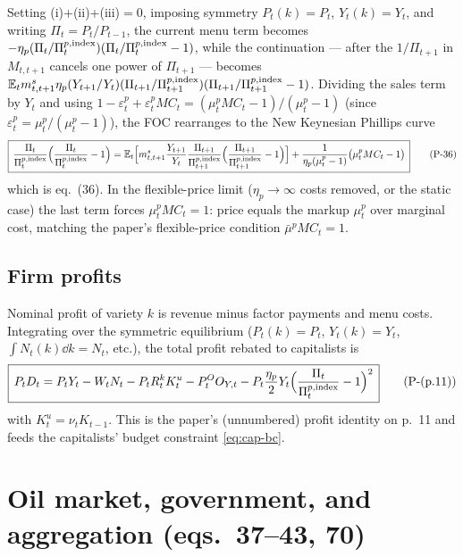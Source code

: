 Setting (i)+(ii)+(iii)$=0$, imposing symmetry $P_t(k)=P_t$, $Y_t(k)=Y_t$, and writing
$\Pi_t=P_t/P_{t-1}$, the current menu term becomes
$-\eta_p(\Pi_t/\Pi^{p,\text{index}}_t)(\Pi_t/\Pi^{p,\text{index}}_t-1)$, while the continuation --- after the
$1/\Pi_{t+1}$ in $M_{t,t+1}$ cancels one power of $\Pi_{t+1}$ --- becomes
$\mathbb{E}_t m^s_{t,t+1}\eta_p(Y_{t+1}/Y_t)(\Pi_{t+1}/\Pi^{p,\text{index}}_{t+1})(\Pi_{t+1}/\Pi^{p,\text{index}}_{t+1}-1)$.
Dividing the sales term by $Y_t$ and using
$1-\varepsilon^p_t+\varepsilon^p_tMC_t=(\mu^p_tMC_t-1)/(\mu^p_t-1)$ (since
$\varepsilon^p_t=\mu^p_t/(\mu^p_t-1)$), the FOC rearranges to the New Keynesian Phillips curve
\begin{equation}\label{eq:36}
\boxed{\,\frac{\Pi_t}{\Pi^{p,\text{index}}_t}\Big(\frac{\Pi_t}{\Pi^{p,\text{index}}_t}-1\Big)
=\mathbb{E}_t\Big[m^s_{t,t+1}\frac{Y_{t+1}}{Y_t}\frac{\Pi_{t+1}}{\Pi^{p,\text{index}}_{t+1}}
\Big(\frac{\Pi_{t+1}}{\Pi^{p,\text{index}}_{t+1}}-1\Big)\Big]+\frac{1}{\eta_p(\mu^p_t-1)}\big(\mu^p_tMC_t-1\big)\,}
\tag{P-36}
\end{equation}
which is eq.\ (36). In the flexible-price limit ($\eta_p\to\infty$ costs removed, or the static case)
the last term forces $\mu^p_tMC_t=1$: price equals the markup $\mu^p_t$ over marginal cost, matching
the paper's flexible-price condition $\bar\mu^pMC_t=1$.

\subsection{Firm profits}
Nominal profit of variety $k$ is revenue minus factor payments and menu costs. Integrating over the
symmetric equilibrium ($P_t(k)=P_t$, $Y_t(k)=Y_t$, $\int N_t(k)\dd k=N_t$, etc.), the total profit
rebated to capitalists is
\begin{equation}\label{eq:profits}
\boxed{\,P_tD_t=P_tY_t-W_tN_t-P_tR^k_tK^u_t-P^O_tO_{Y,t}-P_t\frac{\eta_p}{2}Y_t\Big(\frac{\Pi_t}{\Pi^{p,\text{index}}_t}-1\Big)^2\,}
\tag{P-(p.11)}
\end{equation}
with $K^u_t=\nu_tK_{t-1}$. This is the paper's (unnumbered) profit identity on p.\ 11 and feeds the
capitalists' budget constraint \eqref{eq:cap-bc}.

\section{Oil market, government, and aggregation (eqs.\ 37--43, 70)}\label{sec:agg}

